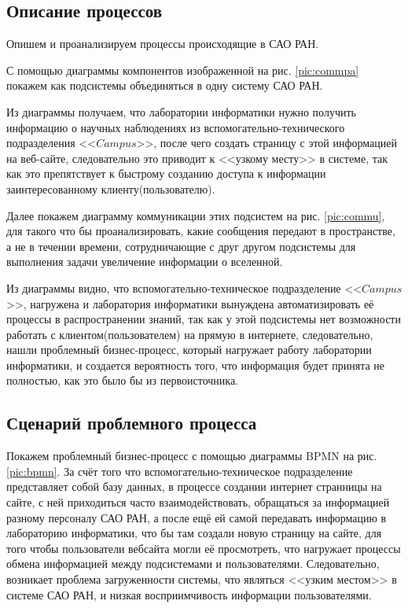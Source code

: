    
\subsection{Описание процессов}

Опишем и проанализируем процессы происходящие в САО РАН. 

С помощью диаграммы компонентов изображенной на рис. \ref{pic:commpa} покажем как подсистемы объединяться в одну систему САО РАН. 

Из диаграммы получаем, что лаборатории информатики нужно получить информацию о научных наблюдениях из вспомогательно-технического подразделения <<$Campus$>>, после чего создать страницу с этой информацией на веб-сайте, следовательно это приводит к <<узкому месту>> в системе, так как это препятствует к быстрому созданию доступа к информации заинтересованному клиенту(пользователю).

Далее покажем диаграмму коммуникации этих подсистем на рис. \ref{pic:commu}, для такого что бы проанализировать, какие сообщения передают в пространстве, а не в течении времени, сотрудничающие с друг другом подсистемы для выполнения задачи увеличение информации о вселенной.


Из диаграммы видно, что вспомогательно-техническое подразделение <<$Campus$>>, нагружена и лаборатория информатики вынуждена автоматизировать её процессы в распространении знаний, так как у этой подсистемы нет возможности работать с клиентом(пользователем) на прямую в интернете, следовательно, нашли проблемный бизнес-процесс, который нагружает работу лаборатории информатики, и создается вероятность того, что информация будет принята не полностью, как это было бы из первоисточника.

\pagebreak
\subsection{Сценарий проблемного процесса}
Покажем проблемный бизнес-процесс с помощью диаграммы BPMN на рис. \ref{pic:bpmn}.
За счёт того что вспомогательно-техническое подразделение представляет собой базу данных, в процессе создании интернет странницы на сайте, с ней приходиться часто взаимодействовать, обращаться за информацией разному персоналу САО РАН, а после ещё ей самой передавать информацию в лабораторию информатики, что бы там создали новую страницу на сайте, для того чтобы пользователи вебсайта могли её просмотреть, что нагружает процессы обмена информацией между подсистемами и пользователями. Следовательно, возникает проблема загруженности системы, что являться <<узким местом>> в системе САО РАН, и низкая восприимчивость информации пользователями.

